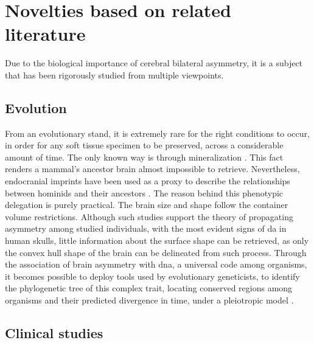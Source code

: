 \section{Novelties based on related literature} 
 Due to the biological importance of cerebral bilateral asymmetry, it is a subject that has been rigorously studied from multiple viewpoints.
 \subsection{Evolution}
 From an evolutionary stand, it is extremely rare for the right conditions to occur, in order for any soft tissue specimen to be preserved, across a considerable amount of time. The only known way is through mineralization \cite{Purnell2018}. This fact renders a mammal's ancestor brain almost impossible to retrieve. Nevertheless, endocranial imprints have been used as a proxy to describe the relationships between hominids and their ancestors \cite{Balzeau2012}\cite{Neubauer2020}. The reason behind this phenotypic delegation is purely practical. The brain size and shape follow the container volume restrictions. Although such studies support the theory of propagating asymmetry among studied individuals, with the most evident signs of \ac{da} in human skulls, little information about the surface shape can be retrieved, as only the convex hull shape of the brain can be delineated from such process. Through the association of brain asymmetry with \acs{dna}, a universal code among organisms, it becomes possible to deploy tools used by evolutionary geneticists, to identify the phylogenetic tree of this complex trait, locating conserved regions among organisms and their predicted divergence in time, under a pleiotropic model \cite{Koch2021}.
 \subsection{Clinical studies}
 
